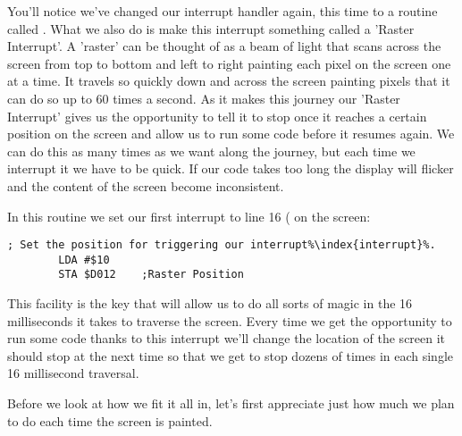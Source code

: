 You'll notice we've changed our interrupt handler again, this time to a routine called
. What we also do is make this interrupt something
called a 'Raster Interrupt'. A 'raster' can be thought of as a beam of light that scans
across the screen from top to bottom and left to right painting each pixel on the screen
one at a time. It travels so quickly down and across the screen painting pixels that it
can do so up to 60 times a second. As it makes this journey our 'Raster Interrupt' gives
us the opportunity to tell it to stop once it reaches a certain position on the screen
and allow us to run some code before it resumes again. We can do this as many times as
we want along the journey, but each time we interrupt it we have to be quick. If our code
takes too long the display will flicker and the content of the screen become inconsistent.

In this routine we set our first interrupt to line 16 ( on the screen:

\begin{lstlisting}[caption=In \icode{InitializeSpritesAndInterruptsForTitleScreen\index{InitializeSpritesAndInterruptsForTitleScreen}},escapechar=\%]
        ; Set the position for triggering our interrupt%\index{interrupt}%.
        LDA #$10
        STA $D012    ;Raster Position
\end{lstlisting}

This facility is the key that will allow us to do all sorts of magic in the 16 milliseconds
it takes to traverse the screen. Every time we get the opportunity to run some code thanks
to this interrupt we'll change the location of the screen it should stop at the next time
so that we get to stop dozens of times in each single 16 millisecond traversal.

Before we look at how we fit it all in, let's first appreciate just how much we plan to
do each time the screen is painted.

